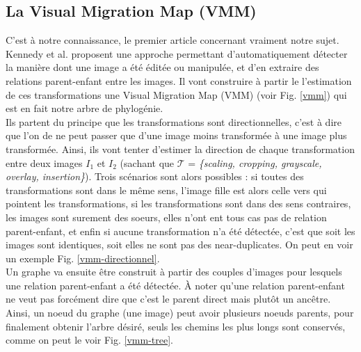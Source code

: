 \documentclass[utf8]{stageM2R} %
\begin{document}
\subsection{La Visual Migration Map (VMM)}
C'est à notre connaissance, le premier article concernant vraiment notre sujet. Kennedy et al. \cite{kennedy2008internet} proposent une approche permettant d'automatiquement détecter la manière dont une image a été éditée ou manipulée, et d'en extraire des relations parent-enfant entre les images. Il vont construire à partir le l'estimation de ces transformations une Visual Migration Map (VMM) (voir Fig. \ref{vmm}) qui est en fait notre arbre de phylogénie.
\\ \indent
Ils partent du principe que les transformations sont directionnelles, c'est à dire que l'on de ne peut passer que d'une image moins transformée à une image plus transformée. Ainsi, ils vont tenter d'estimer la direction de chaque transformation entre deux images $I_{1}$ et $I_{2}$ (sachant que $\mathcal{T}$ = \textit{\{scaling, cropping, grayscale, overlay, insertion\}}). Trois scénarios sont alors possibles : si toutes des transformations sont dans le même sens, l'image fille est alors celle vers qui pointent les transformations, si les transformations sont dans des sens contraires, les images sont surement des soeurs, elles n'ont ent tous cas pas de relation parent-enfant, et enfin si aucune transformation n'a été détectée, c'est que soit les images sont identiques, soit elles ne sont pas des near-duplicates. On peut en voir un exemple Fig. \ref{vmm-directionnel}.
\\ \indent
Un graphe va ensuite être construit à partir des couples d'images pour lesquels une relation parent-enfant a été détectée. À noter qu'une relation parent-enfant ne veut pas forcément dire que c'est le parent direct mais plutôt un ancêtre. Ainsi, un noeud du graphe (une image) peut avoir plusieurs noeuds parents, pour finalement obtenir l'arbre désiré, seuls les chemins les plus longs sont conservés, comme on peut le voir Fig. \ref{vmm-tree}.


\end{document}
